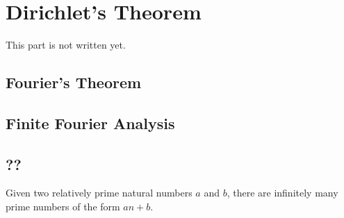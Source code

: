 \chapter{Dirichlet's Theorem}

This part is not written yet. \\

\td 


\section{Fourier's Theorem}

\section{Finite Fourier Analysis}

\section{??}

\begin{theorem}
    Given two relatively prime natural numbers $a$ and $b$, there are infinitely many prime numbers of the form $an+b$.
\end{theorem}